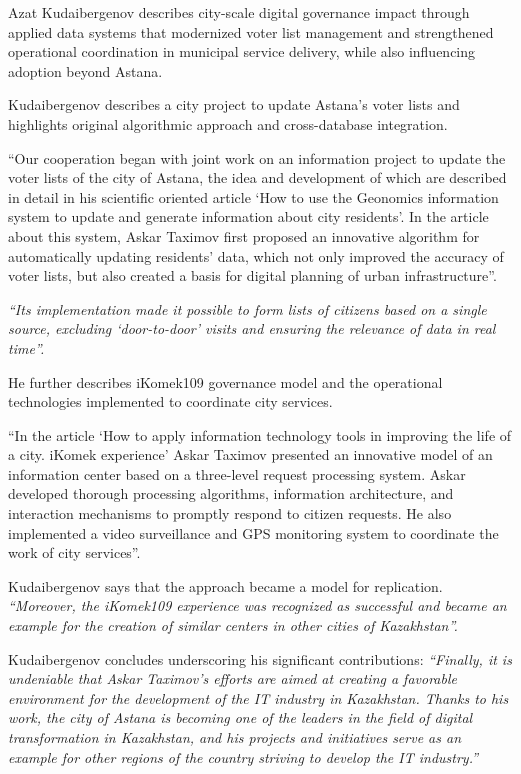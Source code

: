 Azat Kudaibergenov describes \mrls city-scale digital governance impact through applied data systems that modernized voter list management and strengthened operational coordination in municipal service delivery, while also influencing adoption beyond Astana.

Kudaibergenov describes a city project to update Astana’s voter lists and highlights \mrls original algorithmic approach and cross-database integration.
\begin{fullquote}
``Our cooperation began with joint work on an information project to update the voter lists of the city of Astana, the idea and development of which are described in detail in his scientific oriented article `How to use the Geonomics information system to update and generate information about city residents'. In the article about this system, Askar Taximov first proposed an innovative algorithm for automatically updating residents' data, which not only improved the accuracy of voter lists, but also created a basis for digital planning of urban infrastructure''.
\end{fullquote}
\emph{``Its implementation made it possible to form lists of citizens based on a single source, excluding `door-to-door' visits and ensuring the relevance of data in real time''.}

He further describes \mrls iKomek109 governance model and the operational technologies implemented to coordinate city services.
\begin{fullquote}
``In the article `How to apply information technology tools in improving the life of a city. iKomek experience' Askar Taximov presented an innovative model of an information center based on a three-level request processing system. Askar developed thorough processing algorithms, information architecture, and interaction mechanisms to promptly respond to citizen requests. He also implemented a video surveillance and GPS monitoring system to coordinate the work of city services''.
\end{fullquote}

Kudaibergenov says that the approach became a model for replication.
\emph{``Moreover, the iKomek109 experience was recognized as successful and became an example for the creation of similar centers in other cities of Kazakhstan''.}

Kudaibergenov concludes underscoring his significant contributions:
\emph{``Finally, it is undeniable that Askar Taximov’s efforts are aimed at creating a favorable environment for the development of the IT industry in Kazakhstan. Thanks to his work, the city of Astana is becoming one of the leaders in the field of digital transformation in Kazakhstan, and his projects and initiatives serve as an example for other regions of the country striving to develop the IT industry.''}  




